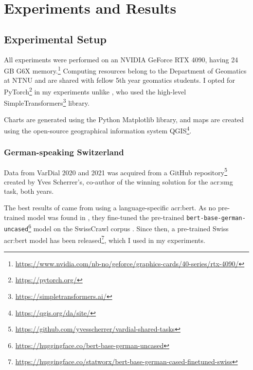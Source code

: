 \section{Experiments and Results}
\label{sec:Experiments}

\begin{comment}
Trying and failing is a major part of research.
However, to have a chance of success you need a plan driving the experimental research.
So first decide what experiments or series of experiments you plan --- and describe them in this section.
\end{comment}

\subsection{Experimental Setup}
\label{sec:experimentalSetup}


All experiments were performed on an NVIDIA GeForce RTX 4090, having 24 GB G6X memory.\footnote{\url{https://www.nvidia.com/nb-no/geforce/graphics-cards/40-series/rtx-4090/}} Computing resources belong to the Department of Geomatics at NTNU and are shared with fellow 5th year geomatics students. I opted for PyTorch\footnote{\url{https://pytorch.org/}} in my experiments unlike \cite{scherrerHeLjuVarDial20202020}, who used the high-level SimpleTransformers\footnote{\url{https://simpletransformers.ai/}} library.

Charts are generated using the Python Matplotlib library, and maps are created using the open-source geographical information system QGIS\footnote{\url{https://qgis.org/da/site/}}.

\subsubsection{German-speaking Switzerland}

Data from VarDial 2020 and 2021 was acquired from a GitHub repository\footnote{\url{https://github.com/yvesscherrer/vardial-shared-tasks}} created by Yves Scherrer's, co-author of the winning solution for the \gls{acr:smg} task, both years.

The best results of \cite{scherrerHeLjuVarDial20202020} came from using a language-specific \acrshort{acr:bert}. As no pre-trained model was found in \citeyear{scherrerHeLjuVarDial20202020}, they fine-tuned the pre-trained \texttt{bert-base-german-uncased}\footnote{\url{https://huggingface.co/bert-base-german-uncased}} model on the SwissCrawl corpus \citep[3-4]{scherrerHeLjuVarDial20202020}. Since then, a pre-trained Swiss \acrshort{acr:bert} model has been released\footnote{\url{https://huggingface.co/statworx/bert-base-german-cased-finetuned-swiss}}, which I used in my experiments.

